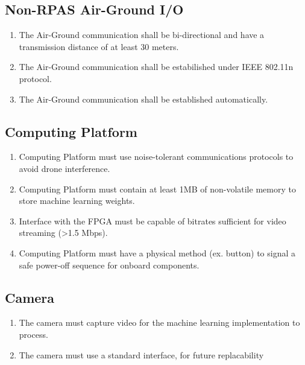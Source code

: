 \documentclass[10pt,letterpaper]{article}
\begin{document}
\subsection{Non-RPAS Air-Ground I/O}
\begin{enumerate}[label=F.CM.\arabic*, wide=1cm, widest=3cm, leftmargin=*, font=\bfseries, noitemsep,topsep=0pt, parsep=4pt, partopsep=0pt]
	\item The Air-Ground communication shall be bi-directional and have a transmission distance of at least 30 meters.
	\item The Air-Ground communication shall be estabilished under IEEE 802.11n protocol.
	\item The Air-Ground communication shall be established automatically.
\end{enumerate}

\subsection{Computing Platform}
\begin{enumerate}[label=F.CP.\arabic*, wide=1cm, widest=3cm, leftmargin=*, font=\bfseries, noitemsep,topsep=0pt, parsep=4pt, partopsep=0pt]
	\item Computing Platform must use noise-tolerant communications protocols to avoid drone interference.
	\item Computing Platform must contain at least 1MB of non-volatile memory to store machine learning weights.
	\item Interface with the FPGA must be capable of bitrates sufficient for video streaming (>1.5 Mbps).
	\item Computing Platform must have a physical method (ex. button) to signal a safe power-off sequence for onboard components.
\end{enumerate}

\subsection{Camera}
\begin{enumerate}[label=F.CAM.\arabic*, wide=1cm, widest=3cm, leftmargin=*, font=\bfseries, noitemsep,topsep=0pt, parsep=4pt, partopsep=0pt]
	\item The camera must capture video for the machine learning implementation to process.
	\item The camera must use a standard interface, for future replacability
\end{enumerate}
\end{document}
